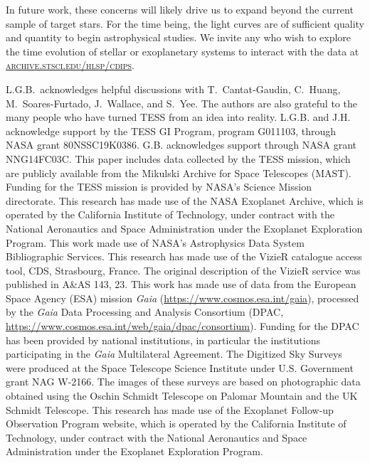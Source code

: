 \documentclass[12pt,twocolumn,tighten,trackchanges]{aastex62}
\newcommand{\stscilink}{\textsc{\url{archive.stsci.edu/hlsp/cdips}}}
\begin{document}
In future work, these concerns will likely drive us to expand beyond
the current sample of target stars.  For the time being, the light
curves are of sufficient quality and quantity to begin astrophysical
studies.  We invite any who wish to explore the time evolution of
stellar or exoplanetary systems to interact with the data at
\stscilink.



\acknowledgements
L.G.B.\ acknowledges helpful discussions with 
T.~Cantat-Gaudin,
C.~Huang,
M.~Soares-Furtado,
J.~Wallace, and
S.~Yee.  The authors are also
grateful to the many people who have turned TESS from an idea into
reality.
%
L.G.B. and J.H. acknowledge support by the TESS GI Program, program
G011103, through NASA grant 80NSSC19K0386.
%
G.B. acknowledges support through NASA grant NNG14FC03C.
%
This paper includes data collected by the TESS mission, which are
publicly available from the Mikulski Archive for Space Telescopes
(MAST).
%
Funding for the TESS mission is provided by NASA's Science Mission
directorate.
%
This research has made use of the NASA Exoplanet Archive, which is
operated by the California Institute of Technology, under contract
with the National Aeronautics and Space Administration under the
Exoplanet Exploration Program.
%
This work made use of NASA's Astrophysics Data System Bibliographic
Services.
%
This research has made use of the VizieR catalogue access tool, CDS,
Strasbourg, France. The original description of the VizieR service was
published in A\&AS 143, 23.
%
This work has made use of data from the European Space Agency (ESA)
mission {\it Gaia} (\url{https://www.cosmos.esa.int/gaia}), processed
by the {\it Gaia} Data Processing and Analysis Consortium (DPAC,
\url{https://www.cosmos.esa.int/web/gaia/dpac/consortium}). Funding
for the DPAC has been provided by national institutions, in particular
the institutions participating in the {\it Gaia} Multilateral
Agreement.
%
The Digitized Sky Surveys were produced at the Space Telescope Science
Institute under U.S. Government grant NAG W-2166. The images of these
surveys are based on photographic data obtained using the Oschin
Schmidt Telescope on Palomar Mountain and the UK Schmidt Telescope.
%
This research has made use of the Exoplanet Follow-up Observation
Program website, which is operated by the California Institute of
Technology, under contract with the National Aeronautics and Space
Administration under the Exoplanet Exploration Program.
%
\newline
%
\end{document}

